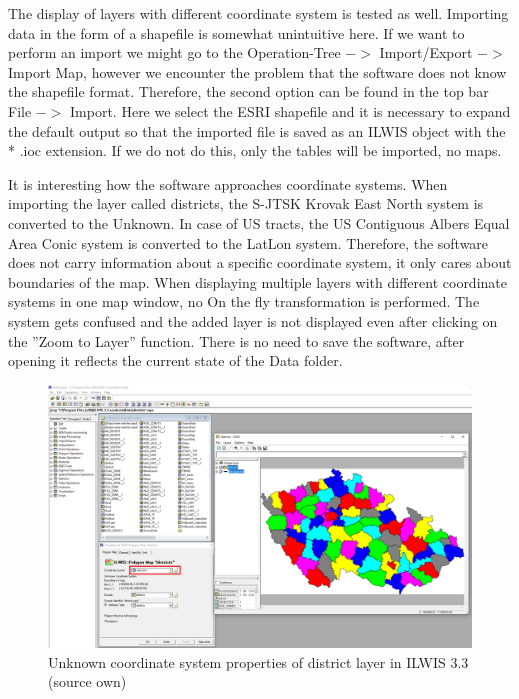 \documentclass[a4paper,10pt,twoside]{article}
\begin{document}
The display of layers with different coordinate system is tested as well. Importing data in the form of a shapefile is somewhat unintuitive here. If we want to perform an import we might go to the Operation-Tree $->$ Import/Export $->$ Import Map, however we encounter the problem that the software does not know the shapefile format. Therefore, the second option can be found in the top bar File $->$ Import. Here we select the ESRI shapefile and it is necessary to expand the default output so that the imported file is saved as an ILWIS object with the * .ioc extension. If we do not do this, only the tables will be imported, no maps.

It is interesting how the software approaches coordinate systems. When importing the layer called districts, the S-JTSK Krovak East North system is converted to the Unknown. In case of US tracts, the US Contiguous Albers Equal Area Conic system is converted to the LatLon system. Therefore, the software does not carry information about a specific coordinate system, it only cares about boundaries of the map. When displaying multiple layers with different coordinate systems in one map window, no On the fly transformation is performed. The system gets confused and the added layer is not displayed even after clicking on the ''Zoom to Layer'' function. 
There is no need to save the software, after opening it reflects the current state of the Data folder.

\vspace{0.3cm}
\begin{figure}[hbt!] 
\begin{center}
\includegraphics[width=15cm]{../pictures/ilwis_pridani_mapy.png} 
\caption[Unknown coordinate system properties of district layer in ILWIS 3.3 (source own)]{Unknown coordinate system properties of district layer in ILWIS 3.3 (source own)}
\label{fig:ilwis_pridani_mapy.png}
\end{center}
\end{figure}
\end{document}
